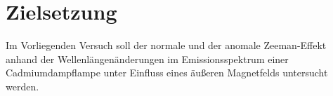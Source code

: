 \section{Zielsetzung}
\label{sec:Zielsetzung}
Im Vorliegenden Versuch soll der normale und der anomale Zeeman-Effekt anhand der Wellenlängenänderungen  im Emissionsspektrum einer Cadmiumdampflampe unter Einfluss eines äußeren Magnetfelds untersucht werden. 
